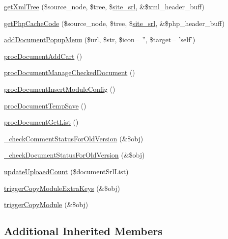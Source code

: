 \begin{DoxyCompactItemize}
\item 
\hyperlink{classdocumentController_ad18d5e7c2cfbef82020548e13e00df7d}{get\-Xml\-Tree} (\$source\-\_\-node, \$tree, \$\hyperlink{ko_8install_8php_a8b1406b4ad1048041558dce6bfe89004}{site\-\_\-srl}, \&\$xml\-\_\-header\-\_\-buff)
\item 
\hyperlink{classdocumentController_a0e0c1eb0506e936703b6b2b4ed958e5f}{get\-Php\-Cache\-Code} (\$source\-\_\-node, \$tree, \$\hyperlink{ko_8install_8php_a8b1406b4ad1048041558dce6bfe89004}{site\-\_\-srl}, \&\$php\-\_\-header\-\_\-buff)
\item 
\hyperlink{classdocumentController_a763e7cfbb01e26e7b0adaf0d25ff9373}{add\-Document\-Popup\-Menu} (\$url, \$str, \$icon= '', \$target= 'self')
\item 
\hyperlink{classdocumentController_a9072167f6533f269be32a0a43e147dae}{proc\-Document\-Add\-Cart} ()
\item 
\hyperlink{classdocumentController_a96dee41cd75a387fee93375d33633aba}{proc\-Document\-Manage\-Checked\-Document} ()
\item 
\hyperlink{classdocumentController_aede408d35ea6622dfa1b39ec52f84e44}{proc\-Document\-Insert\-Module\-Config} ()
\item 
\hyperlink{classdocumentController_a65e4d6ef48c59e92bf82e8ced4b85d4d}{proc\-Document\-Temp\-Save} ()
\item 
\hyperlink{classdocumentController_a23cf92fe7c204813d12c5996360cd939}{proc\-Document\-Get\-List} ()
\item 
\hyperlink{classdocumentController_a3fad5f9653c0ca05bcb1a63a24c318cf}{\-\_\-check\-Comment\-Status\-For\-Old\-Version} (\&\$obj)
\item 
\hyperlink{classdocumentController_ad0d7bdcafe22b9f7ee8f5ae072f3f146}{\-\_\-check\-Document\-Status\-For\-Old\-Version} (\&\$obj)
\item 
\hyperlink{classdocumentController_a2e3e591a2262e0fffc195456248b89ff}{update\-Uploaed\-Count} (\$document\-Srl\-List)
\item 
\hyperlink{classdocumentController_a5e03be29c7b61f87658b604ba80daa88}{trigger\-Copy\-Module\-Extra\-Keys} (\&\$obj)
\item 
\hyperlink{classdocumentController_a612ee2c47ff03e76f6e86fa31ff098a7}{trigger\-Copy\-Module} (\&\$obj)
\end{DoxyCompactItemize}
\subsection*{Additional Inherited Members}


